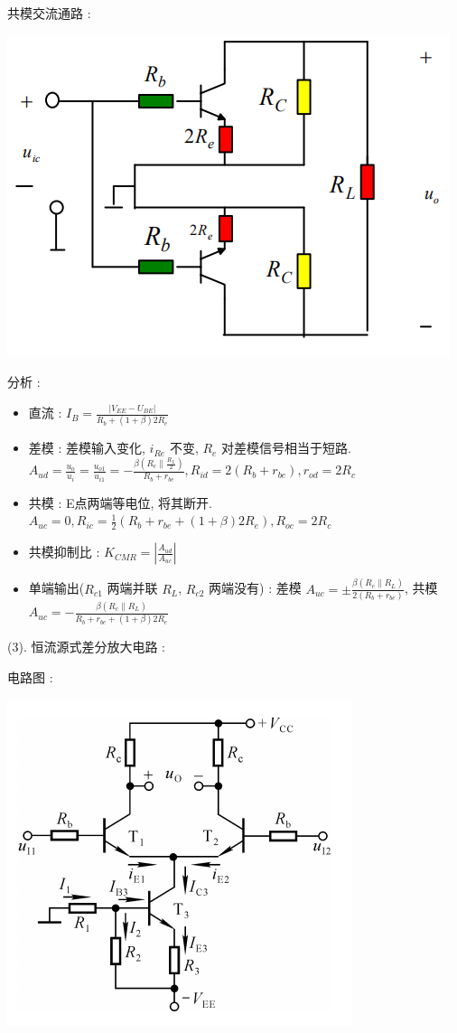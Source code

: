 \documentclass[UTF8, 12pt]{ctexart}
\begin{document}
	共模交流通路 :

	\includegraphics[scale = 0.4]{03/长尾式差分放大电路共模输入交流通路.png} 

	分析 :
	\begin{itemize}[leftmargin = 4em]
		\item 直流 : $ I_{B} = \frac{|V_{EE}-U_{BE}|}{R_{b}+(1+\beta)2R_{e}} $
		\item 差模 : 差模输入变化, $ i_{Re} $ 不变, $ R_{e} $ 对差模信号相当于短路. $ A_{ud} = \frac{u_{o}}{u_{i}} = \frac{u_{o1}}{u_{i1}} = -\frac{\beta(R_{c} \parallel \frac{R_{L}}{2})}{R_{b}+r_{be}}, R_{id} = 2(R_{b}+r_{be}), r_{od} = 2R_{c} $
		\item 共模 : E点两端等电位, 将其断开. $ A_{uc} = 0, R_{ic} = \frac{1}{2}(R_{b}+r_{be}+(1+\beta)2R_{e}), R_{oc} = 2R_{c} $
		\item 共模抑制比 : $ K_{CMR} = |\frac{A_{ud}}{A_{uc}}| $
		\item 单端输出($ R_{c1} $ 两端并联 $ R_{L} $, $ R_{c2} $ 两端没有) : 差模 $ A_{uc} = \pm \frac{\beta(R_{c} \parallel R_{L})}{2(R_{b}+r_{be})} $, 共模 $ A_{uc} = -\frac{\beta(R_{c} \parallel R_{L})}{R_{b}+r_{be}+(1+\beta)2R_{e}} $ 
	\end{itemize}

	(3). 恒流源式差分放大电路 :

	电路图 :

	\includegraphics[scale = 0.4]{03/恒流源式差分放大电路电路图.png}
\end{document}
